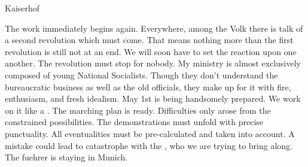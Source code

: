 Kaiserhof

The work immediately begins again. Everywhere, among the Volk there is talk of a second revolution which must come. That means nothing more than the first revolution is still not at an end.  We will soon have to set the reaction upon one another. The revolution must stop for nobody. My ministry is almost exclusively composed of young National Socialists. Though they don't understand the bureaucratic business as well as the old officials, they make up for it with fire, enthusiasm, and fresh idealism. May 1st is being handsomely prepared. We work on it like a . The marching plan is ready. Difficulties only arose from the constrained  possibilities. The demonstrations must unfold with precise punctuality. All eventualities must be pre-calculated and taken into account. A mistake could lead to catastrophe with the , who we are trying to bring along. The fuehrer is staying in Munich.


